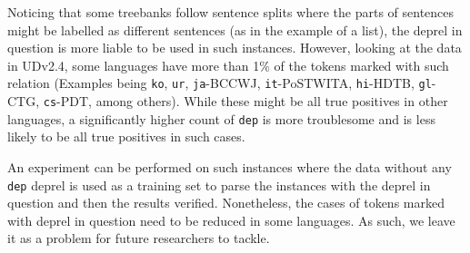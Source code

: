 Noticing that some treebanks follow sentence splits where the parts of sentences might be labelled as different sentences (as in the example of a list), the deprel in question is more liable to be used in such instances. However, looking at the data in UDv2.4, some languages have more than 1\% of the tokens marked with such relation (Examples being \verb|ko|, \verb|ur|, \verb|ja|-BCCWJ, \verb|it|-PoSTWITA, \verb|hi|-HDTB, \verb|gl|-CTG, \verb|cs|-PDT, among others). While these might be all true positives in other languages, a significantly higher count of \verb|dep| is more troublesome and is less likely to be all true positives in such cases.

An experiment can be performed on such instances where the data without any \verb|dep| deprel is used as a training set to parse the instances with the deprel in question and then the results verified. Nonetheless, the cases of tokens marked with deprel in question need to be reduced in some languages. As such, we leave it as a problem for future researchers to tackle.